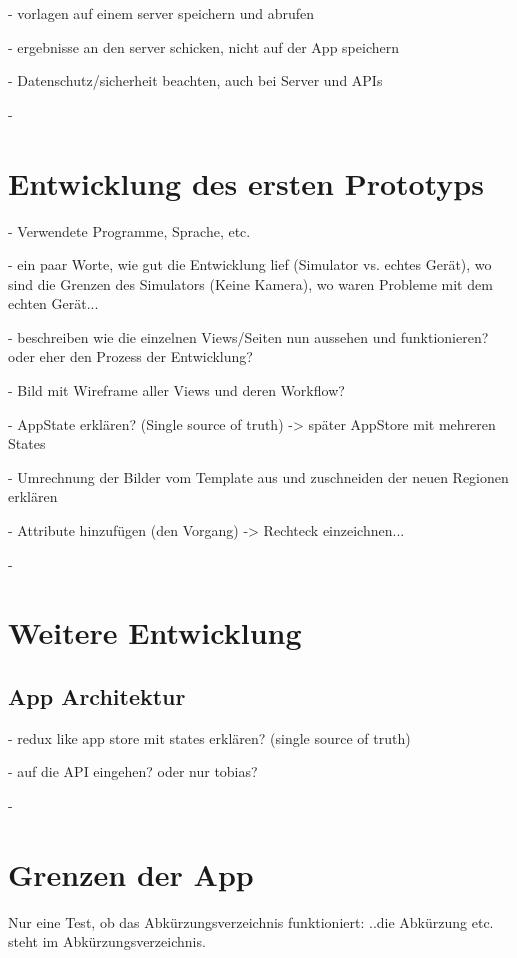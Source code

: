 \documentclass[nomenclature, 150]{HSMW-Thesis}
\begin{document}
	- vorlagen auf einem server speichern und abrufen
	
	- ergebnisse an den server schicken, nicht auf der App speichern
	
	- Datenschutz/sicherheit beachten, auch bei Server und APIs
	
	- 



	
\chapter{Entwicklung des ersten Prototyps}
	- Verwendete Programme, Sprache, etc. 
	
	- ein paar Worte, wie gut die Entwicklung lief (Simulator vs. echtes Gerät), wo sind die Grenzen des Simulators (Keine Kamera), wo waren Probleme mit dem echten Gerät...
	
	- beschreiben wie die einzelnen Views/Seiten nun aussehen und funktionieren? oder eher den Prozess der Entwicklung?
	
	
	- Bild mit Wireframe aller Views und deren Workflow?
	
	- AppState erklären? (Single source of truth) -> später AppStore mit mehreren States
	
	- Umrechnung der Bilder vom Template aus und zuschneiden der neuen Regionen erklären
	
	- Attribute hinzufügen (den Vorgang) -> Rechteck einzeichnen...
	
	- 
	



\chapter{Weitere Entwicklung}

	\section{App Architektur}
		- redux like app store mit states erklären? (single source of truth)
	
		- auf die API eingehen? oder nur tobias?
	
		- 




\chapter{Grenzen der App}
	Nur eine Test, ob das Abkürzungsverzeichnis funktioniert: ..die Abkürzung etc. steht im Abkürzungsverzeichnis.
	
\end{document}
